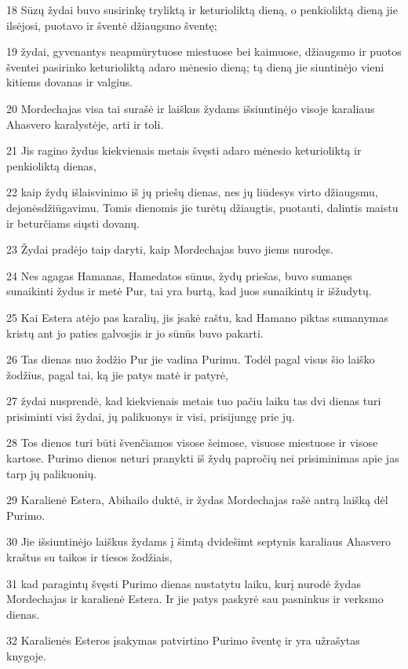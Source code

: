 \par 18 Sūzų žydai buvo susirinkę tryliktą ir keturioliktą dieną, o penkioliktą dieną jie ilsėjosi, puotavo ir šventė džiaugsmo šventę; 
\par 19 žydai, gyvenantys neapmūrytuose miestuose bei kaimuose, džiaugsmo ir puotos šventei pasirinko keturioliktą adaro mėnesio dieną; tą dieną jie siuntinėjo vieni kitiems dovanas ir valgius. 
\par 20 Mordechajas visa tai surašė ir laiškus žydams išsiuntinėjo visoje karaliaus Ahasvero karalystėje, arti ir toli. 
\par 21 Jis ragino žydus kiekvienais metais švęsti adaro mėnesio keturioliktą ir penkioliktą dienas, 
\par 22 kaip žydų išlaisvinimo iš jų priešų dienas, nes jų liūdesys virto džiaugsmu, dejonės­džiūgavimu. Tomis dienomis jie turėtų džiaugtis, puotauti, dalintis maistu ir beturčiams siųsti dovanų. 
\par 23 Žydai pradėjo taip daryti, kaip Mordechajas buvo jiems nurodęs. 
\par 24 Nes agagas Hamanas, Hamedatos sūnus, žydų priešas, buvo sumanęs sunaikinti žydus ir metė Pur, tai yra burtą, kad juos sunaikintų ir išžudytų. 
\par 25 Kai Estera atėjo pas karalių, jis įsakė raštu, kad Hamano piktas sumanymas kristų ant jo paties galvos­jis ir jo sūnūs buvo pakarti. 
\par 26 Tas dienas nuo žodžio Pur jie vadina Purimu. Todėl pagal visus šio laiško žodžius, pagal tai, ką jie patys matė ir patyrė, 
\par 27 žydai nusprendė, kad kiekvienais metais tuo pačiu laiku tas dvi dienas turi prisiminti visi žydai, jų palikuonys ir visi, prisijungę prie jų. 
\par 28 Tos dienos turi būti švenčiamos visose šeimose, visuose miestuose ir visose kartose. Purimo dienos neturi pranykti iš žydų papročių nei prisiminimas apie jas tarp jų palikuonių. 
\par 29 Karalienė Estera, Abihailo duktė, ir žydas Mordechajas rašė antrą laišką dėl Purimo. 
\par 30 Jie išsiuntinėjo laiškus žydams į šimtą dvidešimt septynis karaliaus Ahasvero kraštus su taikos ir tiesos žodžiais, 
\par 31 kad paragintų švęsti Purimo dienas nustatytu laiku, kurį nurodė žydas Mordechajas ir karalienė Estera. Ir jie patys paskyrė sau pasninkus ir verksmo dienas. 
\par 32 Karalienės Esteros įsakymas patvirtino Purimo šventę ir yra užrašytas knygoje.



